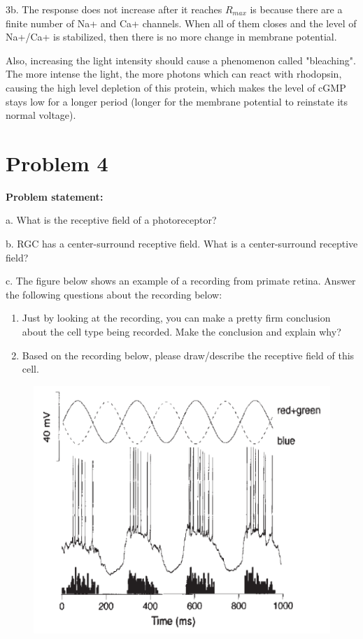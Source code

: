 \documentclass[letterpaper, 11pt]{article}
\begin{document}
3b. The response does not increase after it reaches $R_{max}$ is because there are a finite number of Na+ and Ca+ channels. When all of them closes and the level of Na+/Ca+ is stabilized, then there is no more change in membrane potential. 

Also, increasing the light intensity should cause a phenomenon called "bleaching". The more intense the light, the more photons which can react with rhodopsin, causing the high level depletion of this protein, which makes the level of cGMP stays low for a longer period (longer for the membrane potential to reinstate its normal voltage).

\section{Problem 4}
\label{sec:prob4}
\textbf{Problem statement:} 

a. What is the receptive field of a photoreceptor?

b. RGC has a center-surround receptive field. What is a center-surround receptive field?

c. The figure below shows an example of a recording from primate retina. Answer the following questions about the recording below:
\begin{enumerate}
	\item Just by looking at the recording, you can make a pretty firm conclusion about the cell type being recorded. Make the conclusion and explain why?
	\item Based on the recording below, please draw/describe the receptive field of this cell.
\end{enumerate}

\begin{figure}[htb!]
	\centering
	\includegraphics[width=0.7\linewidth]{3_fig.png}
	\label{fig4}
\end{figure}
\end{document}
